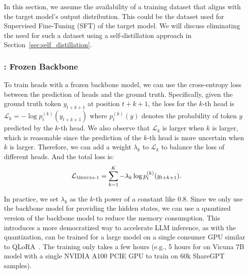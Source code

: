 In this section, we assume the availability of a training dataset that aligns with the target model’s output distribution. This could be the dataset used for Supervised Fine-Tuning (SFT) of the target model. We will discuss eliminating the need for such a dataset using a self-distillation approach in Section~\ref{sec:self_distillation}.
\subsubsection{: Frozen Backbone}
\label{sec:frozen_backbone}
To train \ours heads with a frozen backbone model, we can use the cross-entropy loss between the prediction of \ours heads and the ground truth. Specifically, given the ground truth token $y_{t+k+1}$ at position $t+k+1$, the loss for the $k$-th head is $\mathcal{L}_k = -\log p_t^{(k)}(y_{t+k+1})$ where $p_t^{(k)}(y)$ denotes the probability of token $y$ predicted by the $k$-th head. We also observe that $\mathcal{L}_k$ is larger when $k$ is larger, which is reasonable since the prediction of the $k$-th head is more uncertain when $k$ is larger. Therefore, we can add a weight $\lambda_k$ to $\mathcal{L}_k$ to balance the loss of different heads. And the total \ours loss is:
\begin{align}
    \label{eq:loss_medusa_1}
    \mathcal{L}_{\text{\ours-1}} = \sum_{k=1}^K -\lambda_k\log p_t^{(k)}(y_{t+k+1}).
\end{align}

In practice, we set $\lambda_k$ as the $k$-th power of a constant like $0.8$. Since we only use the backbone model for providing the hidden states, we can use a quantized version of the backbone model to reduce the memory consumption. This introduces a more democratized way to accelerate LLM inference, as with the quantization, \ours can be trained for a large model on a single consumer GPU similar to QLoRA~\citep{dettmers2023qlora}. The training only takes a few hours (e.g., 5 hours for  on Vicuna 7B model with a single NVIDIA A100 PCIE GPU to train on 60k ShareGPT samples).

